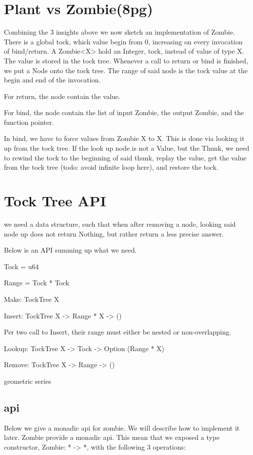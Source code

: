 \section{Plant vs Zombie(8pg)}
Combining the 3 insights above we now sketch an implementation of Zombie.
There is a global tock, which value begin from 0, increasing on every invocation of bind/return.
A Zombie<X> hold an Integer, tock, instead of value of type X.
The value is stored in the tock tree.
Whenever a call to return or bind is finished, we put a Node onto the tock tree.
The range of said node is the tock value at the begin and end of the invocation.

For return, the node contain the value.

For bind, the node contain the list of input Zombie, the output Zombie, and the function pointer.

In bind, we have to force values from Zombie X to X. This is done via looking it up from the tock tree. If the look up node is not a Value, but the Thunk, we need to rewind the tock to the beginning of said thunk, replay the value, get the value from the tock tree (todo: avoid infinite loop here), and restore the tock.

\section{Tock Tree API}
we need a data structure, such that when after removing a node, looking said node up does not return Nothing, but rather return a less precise answer.

Below is an API summing up what we need.

Tock = u64

Range = Tock * Tock

Make: TockTree X

Insert: TockTree X -> Range * X -> ()

Per two call to Insert, their range must either be nested or non-overlapping.

Lookup: TockTree X -> Tock -> Option (Range * X)

Remove: TockTree X -> Range -> ()

geometric series

\subsection{api}
Below we give a monadic api for zombie. We will describe how to implement it later. 
Zombie provide a monadic api. This mean that we exposed a type constructor, Zombie: * -> *,
with the following 3 operations:



